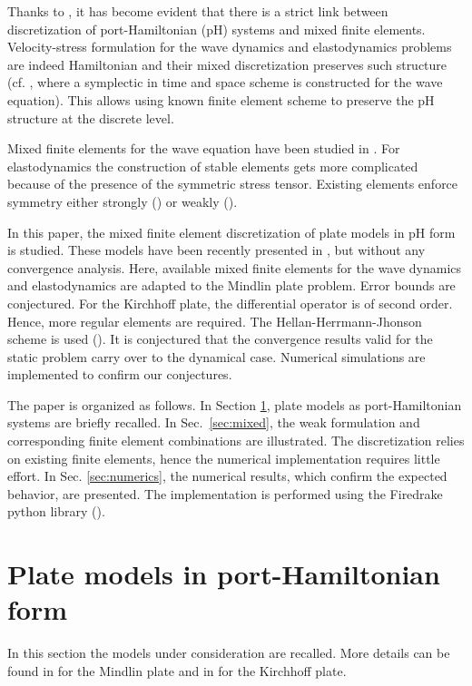 \documentclass{ifacconf}
\begin{document}
Thanks to \cite{CardosoRibeiro2018}, it has become evident that there is a strict link between  discretization of port-Hamiltonian (pH) systems and mixed finite elements. Velocity-stress formulation for the wave dynamics and elastodynamics problems are indeed Hamiltonian and their mixed discretization preserves such structure (cf. \cite{Kirby2015}, where a symplectic in time and space scheme is constructed for the wave equation). This allows using known finite element scheme to preserve the pH structure at the discrete level.

Mixed finite elements for the wave equation have been studied in \cite{Geveci,becacheWave}. For elastodynamics the construction of stable elements gets more complicated because of the presence of the symmetric stress tensor. Existing elements enforce symmetry either strongly (\cite{becacheElas}) or weakly (\cite{ArnoldWeak,mindlinVeiga}).

In this paper, the mixed finite element discretization of plate models in pH form is studied. These models have been recently presented in \cite{BRUGNOLI2019940,BRUGNOLI2019961}, but without any convergence analysis. Here, available mixed finite elements for the wave dynamics and elastodynamics are adapted to the Mindlin plate problem. Error bounds are conjectured. For the Kirchhoff plate, the differential operator is of second order. Hence, more regular elements are required. The Hellan-Herrmann-Jhonson scheme is used (\cite{Blum1990,arnold2019hellan}). It is conjectured that the convergence results valid for the static problem carry over to the dynamical case. Numerical simulations are implemented to confirm our conjectures.

The paper is organized as follows. In Section \ref{sec:pHplates}, plate models as port-Hamiltonian systems are briefly recalled. In Sec.~\ref{sec:mixed}, the weak formulation and corresponding finite element combinations are illustrated. The discretization relies on existing finite elements, hence the numerical implementation requires little effort. In Sec. \ref{sec:numerics}, the numerical results, which confirm the expected behavior, are presented. The implementation is performed using the Firedrake python library (\cite{rathgeber2017firedrake}).

\section{Plate models in port-Hamiltonian form}
\label{sec:pHplates}

In this section the models under consideration are recalled. More details can be found in  \cite{BRUGNOLI2019940} for the Mindlin plate and in \cite{BRUGNOLI2019961} for the Kirchhoff plate. 
\end{document}
